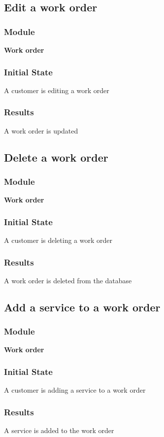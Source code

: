 \documentclass[12pt, titlepage]{article}
\begin{document}
\subsection{Edit a work order}
    \subsubsection{Module}
    \textbf{Work order}
    \subsubsection{Initial State}
    A customer is editing a work order
    \subsubsection{Results}
    A work order is updated

\subsection{Delete a work order}
    \subsubsection{Module}
    \textbf{Work order}
    \subsubsection{Initial State}
    A customer is deleting a work order
    \subsubsection{Results}
    A work order is deleted from the database

\subsection{Add a service to a work order}
    \subsubsection{Module}
    \textbf{Work order}
    \subsubsection{Initial State}
    A customer is adding a service to a work order
    \subsubsection{Results}
    A service is added to the work order
\end{document}
